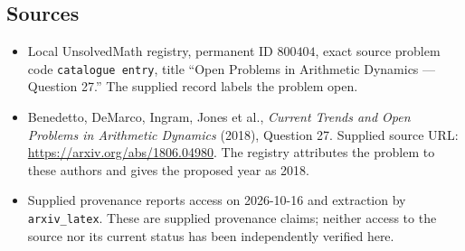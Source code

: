 \documentclass[11pt]{article}
\begin{document}
\subsection{Sources}
\begin{itemize}
\item Local UnsolvedMath registry, permanent ID \(800404\), exact source problem code \texttt{catalogue entry}, title ``Open Problems in Arithmetic Dynamics --- Question 27.'' The supplied record labels the problem open.
\item Benedetto, DeMarco, Ingram, Jones et al., \emph{Current Trends and Open Problems in Arithmetic Dynamics} (2018), Question 27. Supplied source URL: \url{https://arxiv.org/abs/1806.04980}. The registry attributes the problem to these authors and gives the proposed year as 2018.
\item Supplied provenance reports access on 2026-10-16 and extraction by \texttt{arxiv\_latex}. These are supplied provenance claims; neither access to the source nor its current status has been independently verified here.
\end{itemize}
\end{document}

